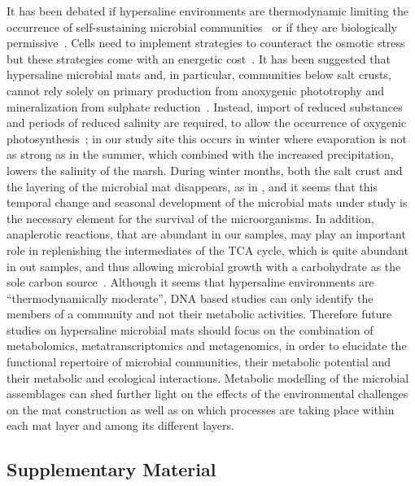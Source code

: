    It has been debated if hypersaline environments are thermodynamic limiting the occurrence of self-sustaining 
   microbial communities~\citep{oren_thermodynamic_2011} or if they are biologically permissive~\citep{lee_nacl-saturated_2018}. 
   Cells need to implement strategies to counteract the osmotic stress~\citep{gunde-cimerman_strategies_2018} 
   but these strategies come with an energetic cost~\citep{meier_limitation_2021}. 
   It has been suggested that hypersaline microbial mats and, in particular, communities below salt crusts, 
   cannot rely solely on primary production from anoxygenic phototrophy and mineralization from sulphate reduction~\citep{meier_limitation_2021}. 
   Instead, import of reduced substances and periods of reduced salinity are required, 
   to allow the occurrence of oxygenic photosynthesis~\citep{meier_limitation_2021}; 
   in our study site this occurs in winter where evaporation is not as strong as in the summer, 
   which combined with the increased precipitation, lowers the salinity of the marsh. 
   During winter months, both the salt crust and the layering of the microbial mat disappears, as in \cite{cardoso_seasonal_2019}, 
   and it seems that this temporal change and seasonal development of the microbial mats under study is the necessary element for the survival of the microorganisms. 
   In addition, anaplerotic reactions, that are abundant in our samples, may play an important role in replenishing the intermediates of the TCA cycle, 
   which is quite abundant in out samples, and thus allowing microbial growth with a carbohydrate 
   as the sole carbon source~\citep{tong_structure_2013, choi_distinct_2016}. 
   Although it seems that hypersaline environments are “thermodynamically moderate”, DNA based studies can only identify 
   the members of a community and not their metabolic activities. 
   Therefore future studies on hypersaline microbial mats should focus on the combination of metabolomics, 
   metatranscriptomics and metagenomics, in order to elucidate the functional repertoire of microbial communities, 
   their metabolic potential and their metabolic and ecological interactions. 
   Metabolic modelling of the microbial assemblages can shed further light on the effects of the environmental 
   challenges on the mat construction as well as on which processes are taking place within each mat layer and 
   among its different layers.


\subsection*{Supplementary Material}
\label{swamp:suppl}   


